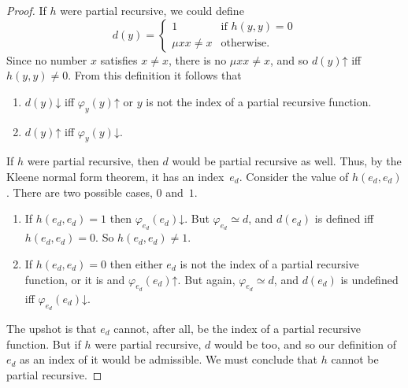 \documentclass[10pt,a4paper]{article}
\theoremstyle{plain}
\theoremstyle{definition}
\theoremstyle{remark}
\providecommand{\cfind}[1]{\varphi_{#1}}
\providecommand{\fdefined}{\mathord{\downarrow}}
\providecommand{\umin}{\mu}
\providecommand{\fundefined}{\mathord{\uparrow}}
\begin{document}
\begin{proof}
If $h$
were partial recursive, we could define
\[
d(y) =
\begin{cases}
1 & \text{if $h(y, y) = 0$}\\
\umin{x}{x \neq x} & \text{otherwise.}
\end{cases}
\]
Since no number $x$ satisfies $x \neq x$, there is no $\umin{x}{x \neq
x}$, and so $d(y) \fundefined$ iff $h(y,y) \neq 0$. From this
definition it follows that
\begin{enumerate}
\item $d(y) \fdefined$ iff $\cfind{y}(y) \fundefined$ or $y$ is
  not the index of a partial recursive function.
\item $d(y) \fundefined$ iff $\cfind{y}(y) \fdefined$.
\end{enumerate}
If $h$ were partial recursive, then $d$ would be partial recursive as
well.  Thus, by the Kleene normal form theorem, it has an index~$e_d$.
Consider the value of $h(e_d, e_d)$. There are two possible cases, $0$
and~$1$.
\begin{enumerate}
\item If $h(e_d, e_d) = 1$ then $\cfind{e_d}(e_d) \fdefined$.  But
  $\cfind{e_d} \simeq d$, and $d(e_d)$ is defined iff $h(e_d, e_d) = 0$.
  So $h(e_d, e_d) \neq 1$.
\item If $h(e_d, e_d) = 0$ then either $e_d$ is not the index of a
  partial recursive function, or it is and $\cfind{e_d}(e_d)
  \fundefined$. But again, $\cfind{e_d} \simeq d$, and $d(e_d)$ is undefined
  iff $\cfind{e_d}(e_d) \fdefined$.
\end{enumerate}
The upshot is that $e_d$ cannot, after all, be the index of a partial
recursive function.  But if $h$ were partial recursive, $d$ would be
too, and so our definition of $e_d$ as an index of it would be
admissible.  We must conclude that $h$ cannot be partial recursive.
\end{proof}
\end{document}
